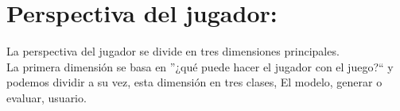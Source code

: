 \begin{table}

\begin{center}
\end{center}
\caption{Figure of ''A Panorama of Artificial and Computational Intelligence in Games'' by
Georgios N. Yannakakis, Member, IEEE, and Julian Togelius, Member, IEEE} \label{Tabla1}
\end{table}




\section*{Perspectiva del jugador:}

La perspectiva del jugador se divide en tres dimensiones principales.\\
	
La primera dimensión se basa en ''¿qué puede hacer el jugador con el juego?`` y podemos dividir a su vez, esta dimensión en tres clases, El modelo, generar o evaluar, usuario.

